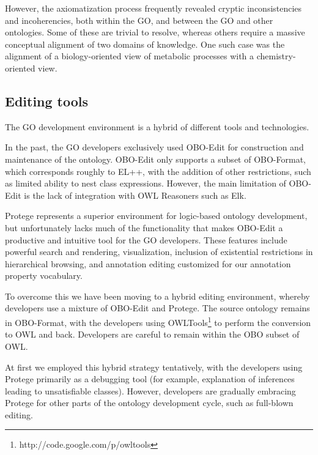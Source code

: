 \documentclass{llncs}
\begin{document}
However, the axiomatization process frequently revealed cryptic
inconsistencies and incoherencies, both within the GO, and between the
GO and other ontologies. Some of these are trivial to resolve, whereas
others require a massive conceptual alignment of two domains of
knowledge. One such case was the alignment of a biology-oriented view
of metabolic processes with a chemistry-oriented view\cite{Hill2013}.

\subsection{Editing tools}

The GO development environment is a hybrid of different tools and
technologies.

In the past, the GO developers exclusively used
OBO-Edit \cite{Day-Richter2007} for construction and maintenance of the
ontology. OBO-Edit only supports a subset of OBO-Format, which
corresponds roughly to EL++, with the addition of other restrictions,
such as limited ability to nest class expressions. However, the main
limitation of OBO-Edit is the lack of integration with OWL Reasoners
such as Elk.

Protege represents a superior environment for logic-based ontology
development, but unfortunately lacks much of the functionality that
makes OBO-Edit a productive and intuitive tool for the GO
developers. These features include powerful search and rendering,
visualization, inclusion of existential restrictions in hierarchical
browsing, and annotation editing customized for our annotation property vocabulary.


To overcome this we have been moving to a hybrid editing environment,
whereby developers use a mixture of OBO-Edit and Protege. The source
ontology remains in OBO-Format, with the developers using 
OWLTools\footnote{http://code.google.com/p/owltools} to perform the conversion to OWL and
back. Developers are careful to remain within the OBO subset of OWL. 

At first we employed this hybrid strategy tentatively, with the
developers using Protege primarily as a debugging tool (for example,
explanation of inferences leading to unsatisfiable classes). However,
developers are gradually embracing Protege for other parts of the
ontology development cycle, such as full-blown editing.
\end{document}
